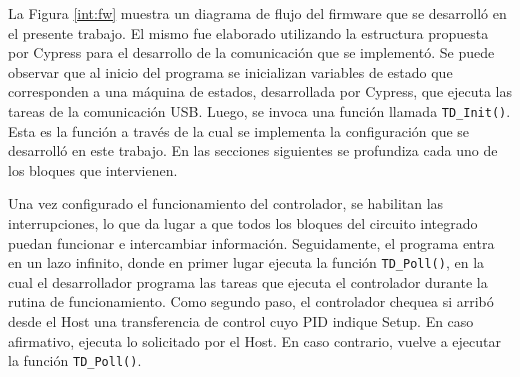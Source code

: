 	La Figura \ref{int:fw} muestra un diagrama de flujo del firmware que se desarrolló en el presente trabajo. El mismo fue elaborado utilizando la estructura propuesta por Cypress para el desarrollo de la comunicación que se implementó. Se puede observar que al inicio del programa se inicializan variables de estado que corresponden a una máquina de estados, desarrollada por Cypress, que ejecuta las tareas de la comunicación USB. Luego, se invoca una función llamada \verb|TD_Init()|. Esta es la función a través de la cual se implementa la configuración que se desarrolló en este trabajo. En las secciones siguientes se profundiza cada uno de los bloques que intervienen.
	
	Una vez configurado el funcionamiento del controlador, se habilitan las interrupciones, lo que da lugar a que todos los bloques del circuito integrado puedan funcionar e intercambiar información. Seguidamente, el programa entra en un lazo infinito, donde en primer lugar ejecuta la función \verb|TD_Poll()|, en la cual el desarrollador programa las tareas que ejecuta el controlador durante la rutina de funcionamiento. Como segundo paso, el controlador chequea si arribó desde el Host una transferencia de control cuyo PID indique Setup. En caso afirmativo, ejecuta lo solicitado por el Host. En caso contrario, vuelve a ejecutar la función \verb|TD_Poll()|.
	
